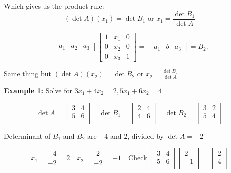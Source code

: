 Which gives us the product rule:
\[
  (\det A)(x_1) = \det B_1 \text{ or }
  x_1 = \frac{\det B_1}{\det A}
\]

\[
\begin{bmatrix} a_1 & a_2 & a_3 \end{bmatrix}
\begin{bmatrix}
1 & x_1 & 0\\
0 & x_2 & 0\\
0 & x_3 & 1
\end{bmatrix}
=
\begin{bmatrix} a_1 & b & a_3 \end{bmatrix}
= B_2.
\]

Same thing but \((\det A)(x_2) = \det B_2\) or \(x_2 = \frac{\det B_2}{\det A}\)  

\textbf{Example 1:} Solve for \(3x_1 + 4x_2 = 2, 5x_1 + 6x_2 = 4\)

\[
  \det A = 
  \begin{bmatrix}
    3 & 4  \\
    5 & 6  \\
  \end{bmatrix}
  \quad 
  \det B_1 = 
  \begin{bmatrix}
    2 & 4  \\
    4 & 6  \\
  \end{bmatrix}
  \quad 
  \det B_2 = 
  \begin{bmatrix}
    3 & 2  \\
    5 & 4  \\
  \end{bmatrix}
\]

Determinant of \(B_1\) and \(B_2\) are \(-4\) and \(2\), divided by \(\det A = -2\)



\[
  x_1 = \frac{-4}{-2} = 2
  \quad 
  x_2 = \frac{2}{-2} = -1
  \quad 
  \text{Check }
  \begin{bmatrix}
    3 & 4  \\
    5 & 6  \\
  \end{bmatrix}
  \begin{bmatrix}
     2 \\
     -1 \\
  \end{bmatrix}
  = 
  \begin{bmatrix}
     2 \\
     4 \\
  \end{bmatrix}
\]


